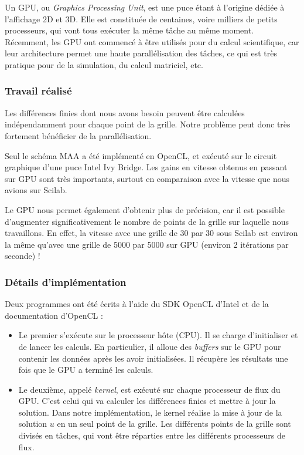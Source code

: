 \documentclass[12pt,a4paper,twoside]{article}
\begin{document}
Un GPU, ou \emph{Graphics Processing Unit}, est une puce étant à l'origine dédiée à l'affichage 2D et 3D. Elle est
constituée de centaines, voire milliers de petits processeurs, qui vont tous exécuter la même tâche au même moment.
Récemment, les GPU ont commencé à être utilisés pour du calcul scientifique, car leur architecture permet une 
haute parallélisation des tâches, ce qui est très pratique pour de la simulation, du calcul matriciel, etc.

\subsubsection{Travail réalisé}

Les différences finies dont nous avons besoin peuvent être calculées indépendamment pour chaque point de la grille.
Notre problème peut donc très fortement bénéficier de la parallélisation.


Seul le schéma MAA a été implémenté en OpenCL, et exécuté sur le circuit graphique d'une puce Intel Ivy Bridge.
Les gains en vitesse obtenus en passant sur GPU sont très importants, surtout en comparaison avec la vitesse
que nous avions sur Scilab.

Le GPU nous permet également d'obtenir plus de précision, car il est possible d'augmenter significativement le nombre
de points
de la grille sur laquelle nous travaillons. En effet, la vitesse avec une grille de 30 par 30 sous Scilab est environ
la même qu'avec une grille de 5000 par 5000 sur GPU (environ 2 itérations par seconde) !

\subsubsection{Détails d'implémentation}

Deux programmes ont été écrits à l'aide du SDK OpenCL d'Intel et de la documentation d'OpenCL \cite{khronos2009khronos}:

\begin{itemize}
\item Le premier s'exécute sur le processeur hôte (CPU). Il se charge d'initialiser et de lancer les calculs. En
particulier, il alloue des \emph{buffers} sur le GPU pour contenir les données après les avoir initialisées. Il 
récupère les résultats une fois que le GPU a terminé les calculs.

\item Le deuxième, appelé \emph{kernel}, est exécuté sur chaque processeur de flux du GPU. C'est celui qui va 
calculer les différences finies et mettre à jour la solution. Dans notre implémentation, le kernel réalise la
mise à jour de la solution $u$ en un seul point de la grille. Les différents points de la grille sont divisés en
tâches, qui vont être réparties entre les différents processeurs de flux. \\

\end{itemize}
\end{document}
